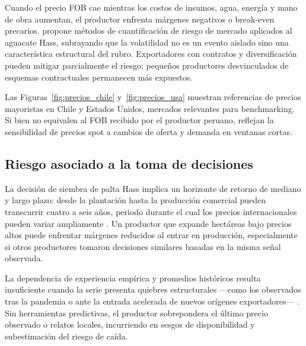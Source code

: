 

Cuando el precio FOB cae mientras los costos de insumos, agua, energ\'ia y mano de obra aumentan, el productor enfrenta m\'argenes negativos o break-even precarios. \citet{Velasquez2025} propone m\'etodos de cuantificaci\'on de riesgo de mercado aplicados al aguacate Hass, subrayando que la volatilidad no es un evento aislado sino una caracter\'istica estructural del rubro. Exportadores con contratos y diversificaci\'on pueden mitigar parcialmente el riesgo; pequeños productores desvinculados de esquemas contractuales permanecen m\'as expuestos.

Las Figuras~\ref{fig:precios_chile} y~\ref{fig:precios_usa} muestran referencias de precios mayoristas en Chile y Estados Unidos, mercados relevantes para benchmarking. Si bien no equivalen al FOB recibido por el productor peruano, reflejan la sensibilidad de precios spot a cambios de oferta y demanda en ventanas cortas.



\subsection{Riesgo asociado a la toma de decisiones}

La decisi\'on de siembra de palta Hass implica un horizonte de retorno de mediano y largo plazo: desde la plantaci\'on hasta la producci\'on comercial pueden transcurrir cuatro a seis a\~nos, periodo durante el cual los precios internacionales pueden variar ampliamente \citep{VitteryFlores2023}. Un productor que expande hect\'areas bajo precios altos puede enfrentar m\'argenes reducidos al entrar en producci\'on, especialmente si otros productores tomaron decisiones similares basadas en la misma se\~nal observada.

La dependencia de experiencia emp\'irica y promedios hist\'oricos resulta insuficiente cuando la serie presenta quiebres estructurales ---como los observados tras la pandemia o ante la entrada acelerada de nuevos or\'igenes exportadores--- \citep{ReisFilho2022}. Sin herramientas predictivas, el productor sobrepondera el \'ultimo precio observado o relatos locales, incurriendo en sesgos de disponibilidad y subestimaci\'on del riesgo de ca\'ida.

